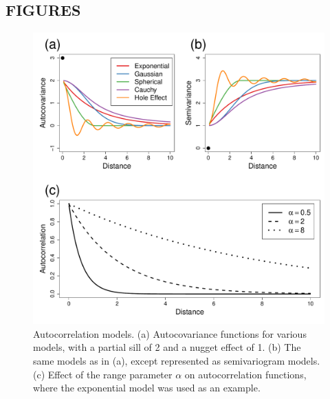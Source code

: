 \documentclass[11pt, titlepage]{article}\usepackage[]{graphicx}\usepackage[]{color}
\begin{document}
\begin{spacing}{1.9}
\begin{flushleft}
\section*{FIGURES}


\begin{singlespace}

	\begin{figure}[H]
	  \begin{center}
	    \includegraphics[width=\linewidth]{figure/autocorrModels-1.pdf}
	  \end{center}
	  \caption{Autocorrelation models. (a) Autocovariance functions for various models, with a partial sill of 2 and a nugget effect of 1. (b) The same models as in (a), except represented as semivariogram models. (c) Effect of the range parameter $\alpha$ on autocorrelation functions, where the exponential model was used as an example.  \label{fig:autocorrModels}}
  \end{figure}





\end{singlespace}
\end{flushleft}
\end{spacing}
\end{document}

